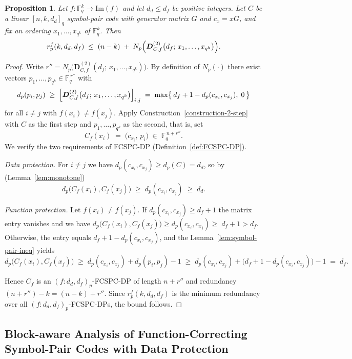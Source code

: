 \documentclass[11pt,draftclsnofoot,journal,onecolumn]{IEEEtran}
\newtheorem{proposition}{Proposition}
\begin{document}
        \begin{proposition}
    \label{cor:two-step-redundancy}
    Let $f:\mathbb{F}_q^{k}\to\mathrm{Im}(f)$ and let $d_d\le d_f$ be positive integers. Let $C$ be a linear $[n,k,d_d]_q$ symbol-pair code with generator matrix $G$ and $c_x=xG$, and fix an ordering $x_1,\dots,x_{q^k}$ of $\mathbb{F}_q^{k}$. Then
    \[
    r^f_p(k,d_d,d_f)\;\le\;(n-k)\;+\; N_p\Bigl(\boldsymbol{D}^{(2)}_{C,f} \bigl(d_f;\,x_1,\dots,x_{q^k}\bigr)\Bigr).
    \]
    \end{proposition}

    \begin{proof}
    Write $r''=N_p\bigl(\boldsymbol{D}^{(2)}_{C,f}(d_f;\,x_1,\dots, x_{q^k})\bigr)$. By definition of $N_p(\cdot)$ there exist vectors $p_{1},\dots,p_{q^k}\in\mathbb{F}_q^{\,r''}$ with
    \[
        d_p(p_{i},p_{j})\;\ge\; \Bigl[\boldsymbol{D}^{(2)}_{C,f} \bigl(d_f;\,x_1,\dots,x_{q^k}\bigr)\Bigr]_{i,j} \;=\;\max\bigl\{\,d_f+1 -d_p(c_{x_i},c_{x_j}),\;0\,\bigr\}
    \]
    for all $i\ne j$ with $f(x_i)\ne f(x_j)$. Apply Construction~\ref{construction-2-step} with $C$ as the first step and $p_{1},\dots,p_{q^k}$ as the second, that is, set
    \[
    C_f(x_i)\;=\;\bigl(c_{x_i},\,p_{i}\bigr)\;\in\;\mathbb{F}_q^{\,n+r''}.
    \]
    We verify the two requirements of FCSPC-DP (Definition~\ref{def:FCSPC-DP}).

    \emph{Data protection.} For $i\ne j$ we have $d_p(c_{x_i},c_{x_j})\ge d_p(C)=d_d$, so by  (Lemma~\ref{lem:monotone})
    \[
        d_p\bigl(C_f(x_i),C_f(x_j)\bigr)\;\ge\;d_p(c_{x_i},c_{x_j})\;\ge\;d_d .
    \]

    \emph{Function protection.} Let $f(x_i)\ne f(x_j)$. If $d_p(c_{x_i},c_{x_j})\ge d_f+1$ the matrix entry vanishes and we have  $d_p\bigl(C_f(x_i),C_f(x_j)\bigr)\ge d_p(c_{x_i},c_{x_j}) \ge\;d_f+1>d_f$. Otherwise, the entry equals $d_f+1-d_p(c_{x_i},c_{x_j})$, and the Lemma~\ref{lem:symbol-pair-ineq} yields
    \[
        d_p\bigl(C_f(x_i),C_f(x_j)\bigr) \;\ge\;d_p(c_{x_i},c_{x_j})+d_p(p_{i},p_{j})-1 \;\ge\;d_p(c_{x_i},c_{x_j})+\bigl(d_f+1-d_p(c_{x_i},c_{x_j})\bigr)-1 \;=\;d_f .
    \]

Hence $C_f$ is an $(f:d_d,d_f)_p$-FCSPC-DP of length $n+r''$ and redundancy
$(n+r'')-k=(n-k)+r''$. Since $r^f_p(k,d_d,d_f)$ is the minimum redundancy over
all $(f:d_d,d_f)_p$-FCSPC-DPs, the bound follows.
\end{proof}
\subsection{Block-aware Analysis of Function-Correcting Symbol-Pair Codes with Data Protection}
\end{document}

